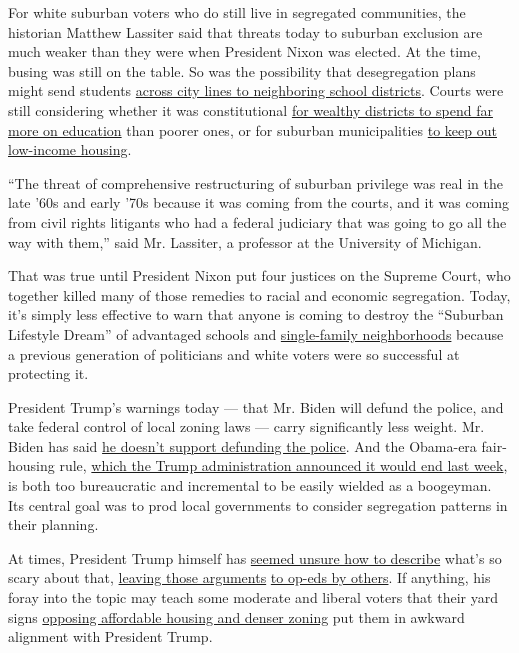 For white suburban voters who do still live in segregated communities,
the historian Matthew Lassiter said that threats today to suburban
exclusion are much weaker than they were when President Nixon was
elected. At the time, busing was still on the table. So was the
possibility that desegregation plans might send students
\href{https://www.oyez.org/cases/1973/73-434}{across city lines to
neighboring school districts}. Courts were still considering whether it
was constitutional \href{https://www.oyez.org/cases/1972/71-1332}{for
wealthy districts to spend far more on education} than poorer ones, or
for suburban municipalities
\href{https://supreme.justia.com/cases/federal/us/402/137/}{to keep out
low-income housing}.

``The threat of comprehensive restructuring of suburban privilege was
real in the late '60s and early '70s because it was coming from the
courts, and it was coming from civil rights litigants who had a federal
judiciary that was going to go all the way with them,'' said Mr.
Lassiter, a professor at the University of Michigan.

That was true until President Nixon put four justices on the Supreme
Court, who together killed many of those remedies to racial and economic
segregation. Today, it's simply less effective to warn that anyone is
coming to destroy the ``Suburban Lifestyle Dream'' of advantaged schools
and
\href{https://www.nytimes3xbfgragh.onion/interactive/2019/06/18/upshot/cities-across-america-question-single-family-zoning.html}{single-family
neighborhoods} because a previous generation of politicians and white
voters were so successful at protecting it.

President Trump's warnings today --- that Mr. Biden will defund the
police, and take federal control of local zoning laws --- carry
significantly less weight. Mr. Biden has said
\href{https://www.npr.org/sections/live-updates-protests-for-racial-justice/2020/06/08/872376757/biden-opposes-defunding-police-campaign-says}{he
doesn't support defunding the police}. And the Obama-era fair-housing
rule,
\href{https://www.nytimes3xbfgragh.onion/2020/07/23/us/politics/trump-housing-discrimination-suburbs.html}{which
the Trump administration announced it would end last week}, is both too
bureaucratic and incremental to be easily wielded as a boogeyman. Its
central goal was to prod local governments to consider segregation
patterns in their planning.

At times, President Trump himself has
\href{https://twitter.com/realDonaldTrump/status/1278136326647406593}{seemed
unsure how to describe} what's so scary about that,
\href{https://twitter.com/realDonaldTrump/status/1286372175117791236}{leaving
those arguments}
\href{https://www.nationalreview.com/corner/biden-and-dems-are-set-to-abolish-the-suburbs/}{to
op-eds by others}. If anything, his foray into the topic may teach some
moderate and liberal voters that their yard signs
\href{https://www.nytimes3xbfgragh.onion/2018/08/21/upshot/home-ownership-nimby-bipartisan.html}{opposing
affordable housing and denser zoning} put them in awkward alignment with
President Trump.

